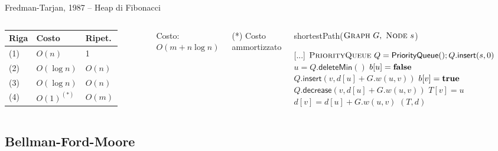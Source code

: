 \vspace{-9pt}
\begin{frame}{Fredman-Tarjan, 1987 -- Heap di Fibonacci}


\vspace{-9pt}

\begin{columns}

\begingroup
\renewcommand*{\arraystretch}{1.2}
\begin{tabular}{|l|l|l|}
\hline
Riga & Costo & Ripet. \\\hline
(1) & $O(n)$ & 1 \\\hline
(2) & $O(\log n)$ & $O(n)$ \\\hline
(3) & $O(\log n)$ & $O(n)$ \\\hline
(4) & $O(1)^{(*)}$ & $O(m)$ \\\hline
\end{tabular}
\endgroup

\medskip
Costo: \alert{$O(m + n \log n)$}

\medskip
(*) Costo ammortizzato

\vspace{-12pt}
\tiny
\begin{Procedure}
\caption[A]{\textsf{shortestPath}($\textsc{Graph}\ G,\ \textsc{Node}\ s$)}
[...]\;
\alert{$\textsc{PriorityQueue}\ Q = \textsf{PriorityQueue}(); Q.\textsf{insert}(s, 0)$}\;
{
  \alert{$u = Q.\textsf{deleteMin}()$}\;
  $b[u] = \FALSE$\;
  {
    {
      {
        \alert{$Q.\textsf{insert}(v, d[u]+G.w(u,v))$}\;
        $b[v] = \TRUE$\;
      }
      {
        \alert{$Q.\textsf{decrease}(v, d[u]+G.w(u,v))$}
      }
      $T[v] = u$\;
      $d[v] = d[u] + G.w(u,v)$\;
    }
  }
}
\Return $(T,d)$
\end{Procedure}
\end{columns}

\end{frame}

\subsection{Bellman-Ford-Moore}

